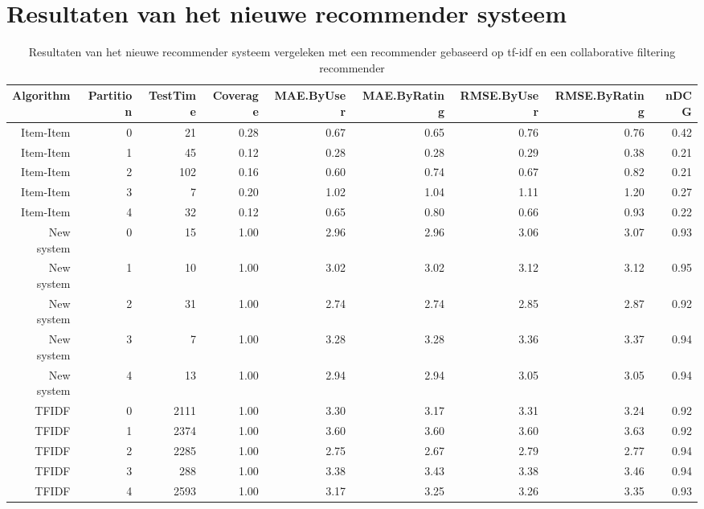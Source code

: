 \chapter{Resultaten van het nieuwe recommender systeem}\label{bijlageA}
\begin{sidewaystable}[htbp] 
\centering 
\caption{Resultaten van het nieuwe recommender systeem vergeleken met een recommender gebaseerd op tf-idf en een collaborative filtering recommender} 
\begin{tabular}{rrrrrrrrr} \toprule Algorithm & Partition & TestTime & Coverage & MAE.ByUser & MAE.ByRating & RMSE.ByUser & RMSE.ByRating & nDCG \\ \midrule Item-Item & 0 & 21 & 0.28 & 0.67 & 0.65 & 0.76 & 0.76 & 0.42 \\ Item-Item & 1 & 45 & 0.12 & 0.28 & 0.28 & 0.29 & 0.38 & 0.21 \\ Item-Item & 2 & 102 & 0.16 & 0.60 & 0.74 & 0.67 & 0.82 & 0.21 \\ Item-Item & 3 & 7 & 0.20 & 1.02 & 1.04 & 1.11 & 1.20 & 0.27 \\ Item-Item & 4 & 32 & 0.12 & 0.65 & 0.80 & 0.66 & 0.93 & 0.22 \\ New system & 0 & 15 & 1.00 & 2.96 & 2.96 & 3.06 & 3.07 & 0.93 \\ New system & 1 & 10 & 1.00 & 3.02 & 3.02 & 3.12 & 3.12 & 0.95 \\ New system & 2 & 31 & 1.00 & 2.74 & 2.74 & 2.85 & 2.87 & 0.92 \\ New system & 3 & 7 & 1.00 & 3.28 & 3.28 & 3.36 & 3.37 & 0.94 \\ New system & 4 & 13 & 1.00 & 2.94 & 2.94 & 3.05 & 3.05 & 0.94 \\ TFIDF & 0 & 2111 & 1.00 & 3.30 & 3.17 & 3.31 & 3.24 & 0.92 \\ TFIDF & 1 & 2374 & 1.00 & 3.60 & 3.60 & 3.60 & 3.63 & 0.92 \\ TFIDF & 2 & 2285 & 1.00 & 2.75 & 2.67 & 2.79 & 2.77 & 0.94 \\ TFIDF & 3 & 288 & 1.00 & 3.38 & 3.43 & 3.38 & 3.46 & 0.94 \\ TFIDF & 4 & 2593 & 1.00 & 3.17 & 3.25 & 3.26 & 3.35 & 0.93 \\ \bottomrule \end{tabular}%
\label{tab:recommender-results-full}%
\end{sidewaystable}%